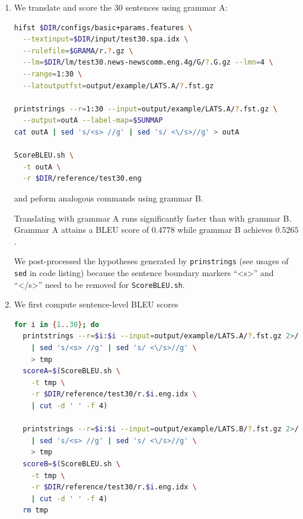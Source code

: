 \documentclass[a4paper,oneside,reqno]{amsart}
\begin{document}
\begin{enumerate}[label=\arabic*.]
  \item
    We translate and score the 30 sentences using grammar A:
    \begin{lstlisting}[language=bash]
hifst $DIR/configs/basic+params.features \
  --textinput=$DIR/input/test30.spa.idx \
  --rulefile=$GRAMA/r.?.gz \
  --lm=$DIR/lm/test30.news-newscomm.eng.4g/G/?.G.gz --lmn=4 \
  --range=1:30 \
  --latoutputfst=output/example/LATS.A/?.fst.gz

printstrings --r=1:30 --input=output/example/LATS.A/?.fst.gz \
  --output=outA --label-map=$SUNMAP
cat outA | sed 's/<s> //g' | sed 's/ <\/s>//g' > outA

ScoreBLEU.sh \
  -t outA \
  -r $DIR/reference/test30.eng
    \end{lstlisting}
    and peform analogous commands using grammar B.

    Translating with grammar A runs significantly faster than with
    grammar B. Grammar A attains a BLEU score of $0.4778$ while grammar B
    achieves $0.5265$.

    We post-processed the hypotheses generated by \texttt{prinstrings} (see
    usages of \texttt{sed} in code listing) because the sentence boundary
    markers ``<s>'' and ``</s>'' need to be removed for \texttt{ScoreBLEU.sh}.

  \item We first compute sentence-level BLEU scores
    \begin{lstlisting}[language=bash]
for i in {1..30}; do
  printstrings --r=$i:$i --input=output/example/LATS.A/?.fst.gz 2>/dev/null \
    | sed 's/<s> //g' | sed 's/ <\/s>//g' \
    > tmp
  scoreA=$(ScoreBLEU.sh \
    -t tmp \
    -r $DIR/reference/test30/r.$i.eng.idx \
    | cut -d ' ' -f 4)

  printstrings --r=$i:$i --input=output/example/LATS.B/?.fst.gz 2>/dev/null \
    | sed 's/<s> //g' | sed 's/ <\/s>//g' \
    > tmp
  scoreB=$(ScoreBLEU.sh \
    -t tmp \
    -r $DIR/reference/test30/r.$i.eng.idx \
    | cut -d ' ' -f 4)
  rm tmp


\end{lstlisting}
\end{enumerate}
\end{document}
